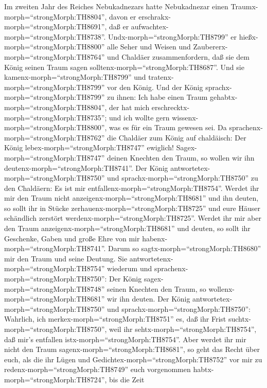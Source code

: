  Im zweiten Jahr des Reiches Nebukadnezars hatte
Nebukadnezar einen Traumx-morph=``strongMorph:TH8804'', davon er
erschrakx-morph=``strongMorph:TH8691'', daß er
aufwachtex-morph=``strongMorph:TH8738''. 
Undx-morph=``strongMorph:TH8799'' er hießx-morph=``strongMorph:TH8800''
alle Seher und Weisen und Zaubererx-morph=``strongMorph:TH8764'' und
Chaldäer zusammenfordern, daß sie dem König seinen Traum sagen
solltenx-morph=``strongMorph:TH8687''. Und sie
kamenx-morph=``strongMorph:TH8799'' und
tratenx-morph=``strongMorph:TH8799'' vor den König.  Und der
König sprachx-morph=``strongMorph:TH8799'' zu ihnen: Ich habe einen
Traum gehabtx-morph=``strongMorph:TH8804'', der hat mich
erschrecktx-morph=``strongMorph:TH8735''; und ich wollte gern
wissenx-morph=``strongMorph:TH8800'', was es für ein Traum gewesen sei.
 Da sprachenx-morph=``strongMorph:TH8762'' die Chaldäer zum
König auf chaldäisch: Der König lebex-morph=``strongMorph:TH8747''
ewiglich! Sagex-morph=``strongMorph:TH8747'' deinen Knechten den Traum,
so wollen wir ihn deutenx-morph=``strongMorph:TH8741''.  Der
König antwortetex-morph=``strongMorph:TH8750'' und
sprachx-morph=``strongMorph:TH8750'' zu den Chaldäern: Es ist mir
entfallenx-morph=``strongMorph:TH8754''. Werdet ihr mir den Traum nicht
anzeigenx-morph=``strongMorph:TH8681'' und ihn deuten, so sollt ihr in
Stücke zerhauenx-morph=``strongMorph:TH8725'' und eure Häuser schändlich
zerstört werdenx-morph=``strongMorph:TH8725''.  Werdet ihr
mir aber den Traum anzeigenx-morph=``strongMorph:TH8681'' und deuten, so
sollt ihr Geschenke, Gaben und große Ehre von mir
habenx-morph=``strongMorph:TH8741''. Darum so
sagtx-morph=``strongMorph:TH8680'' mir den Traum und seine Deutung.
 Sie antwortetenx-morph=``strongMorph:TH8754'' wiederum und
sprachenx-morph=``strongMorph:TH8750'': Der König
sagex-morph=``strongMorph:TH8748'' seinen Knechten den Traum, so
wollenx-morph=``strongMorph:TH8681'' wir ihn deuten.  Der
König antwortetex-morph=``strongMorph:TH8750'' und
sprachx-morph=``strongMorph:TH8750'': Wahrlich, ich
merkex-morph=``strongMorph:TH8751'' es, daß ihr Frist
suchtx-morph=``strongMorph:TH8750'', weil ihr
sehtx-morph=``strongMorph:TH8754'', daß mir's entfallen
istx-morph=``strongMorph:TH8754''.  Aber werdet ihr mir
nicht den Traum sagenx-morph=``strongMorph:TH8681'', so geht das Recht
über euch, als die ihr Lügen und Gedichtex-morph=``strongMorph:TH8752''
vor mir zu redenx-morph=``strongMorph:TH8749'' euch vorgenommen
habtx-morph=``strongMorph:TH8724'', bis die Zeit
